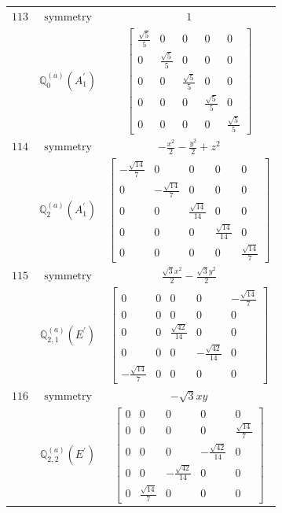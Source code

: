 \documentclass[fleqn,8pt,landscape]{jsarticle}
\begin{document}
\begin{longtable}{ccc}
$ 113 $ & $ \text{symmetry} $ & $ 1 $ \\
$  $ & $ \mathbb{Q}_{0}^{(a)}(A_{1}^{\prime}) $ & $ \begin{bmatrix} \frac{\sqrt{5}}{5} & 0 & 0 & 0 & 0 \\ 0 & \frac{\sqrt{5}}{5} & 0 & 0 & 0 \\ 0 & 0 & \frac{\sqrt{5}}{5} & 0 & 0 \\ 0 & 0 & 0 & \frac{\sqrt{5}}{5} & 0 \\ 0 & 0 & 0 & 0 & \frac{\sqrt{5}}{5} \end{bmatrix} $ \\ \hline
$ 114 $ & $ \text{symmetry} $ & $ - \frac{x^{2}}{2} - \frac{y^{2}}{2} + z^{2} $ \\
$  $ & $ \mathbb{Q}_{2}^{(a)}(A_{1}^{\prime}) $ & $ \begin{bmatrix} - \frac{\sqrt{14}}{7} & 0 & 0 & 0 & 0 \\ 0 & - \frac{\sqrt{14}}{7} & 0 & 0 & 0 \\ 0 & 0 & \frac{\sqrt{14}}{14} & 0 & 0 \\ 0 & 0 & 0 & \frac{\sqrt{14}}{14} & 0 \\ 0 & 0 & 0 & 0 & \frac{\sqrt{14}}{7} \end{bmatrix} $ \\ \hline
$ 115 $ & $ \text{symmetry} $ & $ \frac{\sqrt{3} x^{2}}{2} - \frac{\sqrt{3} y^{2}}{2} $ \\
$  $ & $ \mathbb{Q}_{2,1}^{(a)}(E^{\prime}) $ & $ \begin{bmatrix} 0 & 0 & 0 & 0 & - \frac{\sqrt{14}}{7} \\ 0 & 0 & 0 & 0 & 0 \\ 0 & 0 & \frac{\sqrt{42}}{14} & 0 & 0 \\ 0 & 0 & 0 & - \frac{\sqrt{42}}{14} & 0 \\ - \frac{\sqrt{14}}{7} & 0 & 0 & 0 & 0 \end{bmatrix} $ \\ \hline
$ 116 $ & $ \text{symmetry} $ & $ - \sqrt{3} x y $ \\
$  $ & $ \mathbb{Q}_{2,2}^{(a)}(E^{\prime}) $ & $ \begin{bmatrix} 0 & 0 & 0 & 0 & 0 \\ 0 & 0 & 0 & 0 & \frac{\sqrt{14}}{7} \\ 0 & 0 & 0 & - \frac{\sqrt{42}}{14} & 0 \\ 0 & 0 & - \frac{\sqrt{42}}{14} & 0 & 0 \\ 0 & \frac{\sqrt{14}}{7} & 0 & 0 & 0 \end{bmatrix} $ \\ \hline

\end{longtable}
\end{document}
